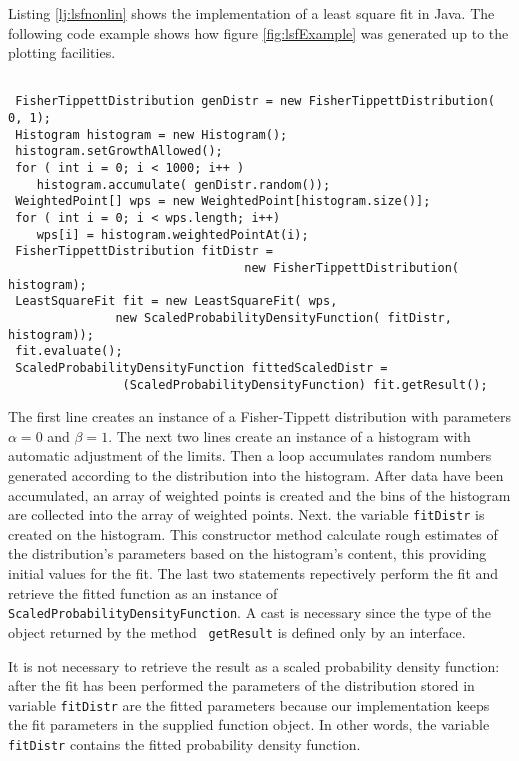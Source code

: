 \documentclass[twoside]{book}
\begin{document}
\noindent Listing \ref{lj:lsfnonlin} shows the implementation of a
least square fit in Java. The following code example shows how
figure \ref{fig:lsfExample} was generated up to the plotting
facilities.
\begin{codeExample}
\label{exj:leastSquare}
\begin{verbatim}

 FisherTippettDistribution genDistr = new FisherTippettDistribution( 0, 1);
 Histogram histogram = new Histogram();
 histogram.setGrowthAllowed();
 for ( int i = 0; i < 1000; i++ )
    histogram.accumulate( genDistr.random());
 WeightedPoint[] wps = new WeightedPoint[histogram.size()];
 for ( int i = 0; i < wps.length; i++)
    wps[i] = histogram.weightedPointAt(i);
 FisherTippettDistribution fitDistr =
                                 new FisherTippettDistribution( histogram);
 LeastSquareFit fit = new LeastSquareFit( wps,
               new ScaledProbabilityDensityFunction( fitDistr, histogram));
 fit.evaluate();
 ScaledProbabilityDensityFunction fittedScaledDistr =
                (ScaledProbabilityDensityFunction) fit.getResult();
\end{verbatim}
\end{codeExample}
The first line creates an instance of a Fisher-Tippett
distribution with parameters $\alpha=0$ and $\beta=1$. The next
two lines create an instance of a histogram with automatic
adjustment of the limits. Then a loop accumulates random numbers
generated according to the distribution into the histogram. After
data have been accumulated, an array of weighted points is created
and the bins of the histogram are collected into the array of
weighted points. Next. the variable {\tt fitDistr} is created on
the histogram. This constructor method calculate rough estimates
of the distribution's parameters based on the histogram's content,
this providing initial values for the fit. The last two statements
repectively perform the fit and retrieve the fitted function as an
instance of {\tt ScaledProbabilityDensityFunction}. A cast is
necessary since the type of the object returned by the method {\tt
getResult} is defined only by an interface.

It is not necessary to retrieve the result as a scaled probability
density function: after the fit has been performed the parameters
of the distribution stored in variable {\tt fitDistr} are the
fitted parameters because our implementation keeps the fit
parameters in the supplied function object. In other words, the
variable {\tt fitDistr} contains the fitted probability density
function.
\end{document}

